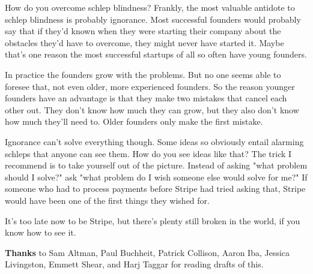 How do you overcome schlep
                    blindness? Frankly, the most valuable antidote to schlep
                    blindness is probably ignorance. Most successful founders
                    would probably say that if they'd known when they were
                    starting their company about the obstacles they'd have to
                    overcome, they might never have started it. Maybe that's one
                    reason the most successful startups of all so often have
                    young founders.

In practice the founders grow
                    with the problems. But no one seems able to foresee that,
                    not even older, more experienced founders. So the reason
                    younger founders have an advantage is that they make two
                    mistakes that cancel each other out. They don't know how
                    much they can grow, but they also don't know how much
                    they'll need to. Older founders only make the first
                    mistake.

Ignorance can't solve everything though.
                    Some ideas so obviously entail alarming schleps that anyone
                    can see them. How do you see ideas like that? The trick I
                    recommend is to take yourself out of the picture. Instead of
                    asking "what problem should I solve?" ask "what problem do I
                    wish someone else would solve for me?" If someone who had to
                    process payments before Stripe had tried asking that, Stripe
                    would have been one of the first things they wished for.

It's
                    too late now to be Stripe, but there's plenty still broken
                    in the world, if you know how to see it.





\textbf{Thanks}
                    to Sam Altman, Paul Buchheit, Patrick Collison, Aaron Iba,
                    Jessica Livingston, Emmett Shear, and Harj Taggar for
                    reading drafts of this.



              
            
          
            
              
                


                  
              
            
          
